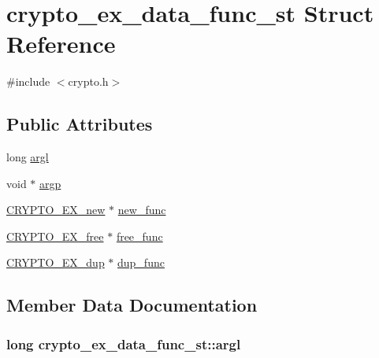 \hypertarget{structcrypto__ex__data__func__st}{}\section{crypto\+\_\+ex\+\_\+data\+\_\+func\+\_\+st Struct Reference}
\label{structcrypto__ex__data__func__st}


{\ttfamily \#include $<$crypto.\+h$>$}

\subsection*{Public Attributes}
\begin{DoxyCompactItemize}
\item 
long \hyperlink{structcrypto__ex__data__func__st_a3290d05d491702cb0c8c19e9e8fee261}{argl}
\item 
void $\ast$ \hyperlink{structcrypto__ex__data__func__st_a06d5de8bf9d50af5c74088e9ea10c60d}{argp}
\item 
\hyperlink{ossl__typ_8h_a524acd717ae812f604e3027f8255d0ba}{C\+R\+Y\+P\+T\+O\+\_\+\+E\+X\+\_\+new} $\ast$ \hyperlink{structcrypto__ex__data__func__st_a83923e40c83463bdf292ed628af6db05}{new\+\_\+func}
\item 
\hyperlink{ossl__typ_8h_a723f84d260fce598230a3cdd45885246}{C\+R\+Y\+P\+T\+O\+\_\+\+E\+X\+\_\+free} $\ast$ \hyperlink{structcrypto__ex__data__func__st_acce7bd60712d1319e666f1bd9fbdeabf}{free\+\_\+func}
\item 
\hyperlink{ossl__typ_8h_a1235777e2310295c33f29a5f06e40682}{C\+R\+Y\+P\+T\+O\+\_\+\+E\+X\+\_\+dup} $\ast$ \hyperlink{structcrypto__ex__data__func__st_a3ba1b7f5fec2a001822f70e5862d72b5}{dup\+\_\+func}
\end{DoxyCompactItemize}


\subsection{Member Data Documentation}
\subsubsection[{\texorpdfstring{argl}{argl}}]{\setlength{\rightskip}{0pt plus 5cm}long crypto\+\_\+ex\+\_\+data\+\_\+func\+\_\+st\+::argl}\hypertarget{structcrypto__ex__data__func__st_a3290d05d491702cb0c8c19e9e8fee261}{}\label{structcrypto__ex__data__func__st_a3290d05d491702cb0c8c19e9e8fee261}
